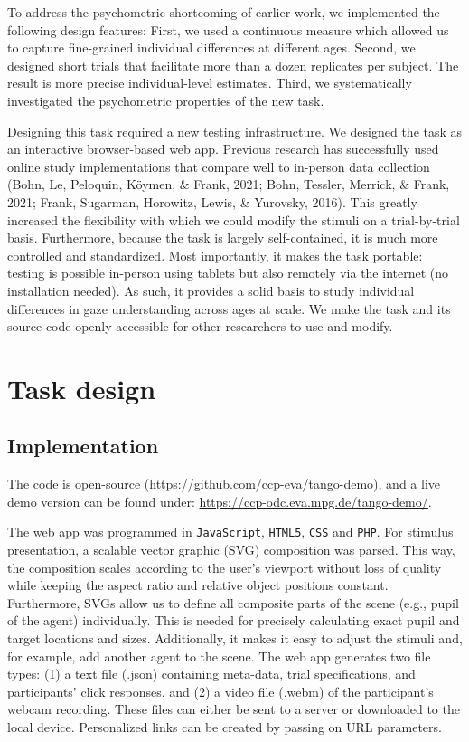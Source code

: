\documentclass[
  man,floatsintext]{apa6}
\begin{document}
To address the psychometric shortcoming of earlier work, we implemented the following design features: First, we used a continuous measure which allowed us to capture fine-grained individual differences at different ages.
Second, we designed short trials that facilitate more than a dozen replicates per subject.
The result is more precise individual-level estimates.
Third, we systematically investigated the psychometric properties of the new task.

Designing this task required a new testing infrastructure.
We designed the task as an interactive browser-based web app.
Previous research has successfully used online study implementations that compare well to in-person data collection (Bohn, Le, Peloquin, Köymen, \& Frank, 2021; Bohn, Tessler, Merrick, \& Frank, 2021; Frank, Sugarman, Horowitz, Lewis, \& Yurovsky, 2016).
This greatly increased the flexibility with which we could modify the stimuli on a trial-by-trial basis.
Furthermore, because the task is largely self-contained, it is much more controlled and standardized.
Most importantly, it makes the task portable: testing is possible in-person using tablets but also remotely via the internet (no installation needed).
As such, it provides a solid basis to study individual differences in gaze understanding across ages at scale.
We make the task and its source code openly accessible for other researchers to use and modify.

\hypertarget{task-design}{%
\section{Task design}\label{task-design}}

\hypertarget{implementation}{%
\subsection{Implementation}\label{implementation}}

The code is open-source (\url{https://github.com/ccp-eva/tango-demo}), and a live demo version can be found under: \url{https://ccp-odc.eva.mpg.de/tango-demo/}.

The web app was programmed in \texttt{JavaScript}, \texttt{HTML5}, \texttt{CSS} and \texttt{PHP}.
For stimulus presentation, a scalable vector graphic (SVG) composition was parsed.
This way, the composition scales according to the user's viewport without loss of quality while keeping the aspect ratio and relative object positions constant.
Furthermore, SVGs allow us to define all composite parts of the scene (e.g., pupil of the agent) individually.
This is needed for precisely calculating exact pupil and target locations and sizes.
Additionally, it makes it easy to adjust the stimuli and, for example, add another agent to the scene.
The web app generates two file types: (1) a text file (.json) containing meta-data, trial specifications, and participants' click responses, and (2) a video file (.webm) of the participant's webcam recording.
These files can either be sent to a server or downloaded to the local device.
Personalized links can be created by passing on URL parameters.
\end{document}
